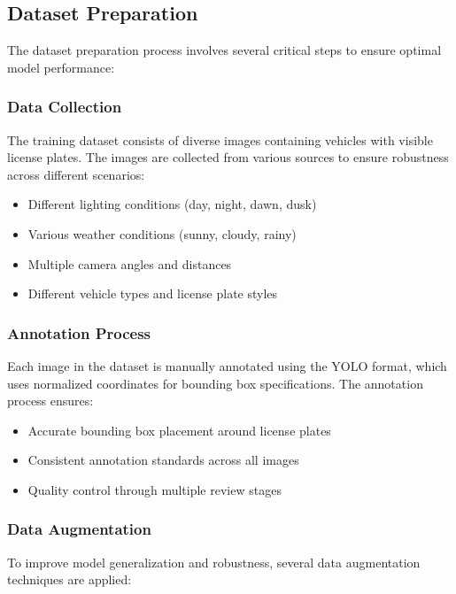 \documentclass[12pt,a4paper]{article}
\begin{document}
\subsection{Dataset Preparation}

The dataset preparation process involves several critical steps to ensure optimal model performance:

\subsubsection{Data Collection}

The training dataset consists of diverse images containing vehicles with visible license plates. The images are collected from various sources to ensure robustness across different scenarios:

\begin{itemize}
    \item Different lighting conditions (day, night, dawn, dusk)
    \item Various weather conditions (sunny, cloudy, rainy)
    \item Multiple camera angles and distances
    \item Different vehicle types and license plate styles
\end{itemize}

\subsubsection{Annotation Process}

Each image in the dataset is manually annotated using the YOLO format, which uses normalized coordinates for bounding box specifications. The annotation process ensures:

\begin{itemize}
    \item Accurate bounding box placement around license plates
    \item Consistent annotation standards across all images
    \item Quality control through multiple review stages
\end{itemize}

\subsubsection{Data Augmentation}

To improve model generalization and robustness, several data augmentation techniques are applied:
\end{document}
